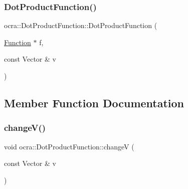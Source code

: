 \hypertarget{classocra_1_1DotProductFunction_a369a245fec0cfe2d4f72bfd577ab7ad0}{}\label{classocra_1_1DotProductFunction_a369a245fec0cfe2d4f72bfd577ab7ad0} 
\subsubsection{\texorpdfstring{Dot\+Product\+Function()}{DotProductFunction()}\hspace{0.1cm}{\footnotesize\ttfamily [2/2]}}
{\footnotesize\ttfamily ocra\+::\+Dot\+Product\+Function\+::\+Dot\+Product\+Function (\begin{DoxyParamCaption}\item[{\hyperlink{classocra_1_1Function}{Function} $\ast$}]{f,  }\item[{const Vector \&}]{v }\end{DoxyParamCaption})}



\subsection{Member Function Documentation}
\hypertarget{classocra_1_1DotProductFunction_a2c7c65e80d7fb5ac1da43421a792f77b}{}\label{classocra_1_1DotProductFunction_a2c7c65e80d7fb5ac1da43421a792f77b} 
\subsubsection{\texorpdfstring{change\+V()}{changeV()}}
{\footnotesize\ttfamily void ocra\+::\+Dot\+Product\+Function\+::changeV (\begin{DoxyParamCaption}\item[{const Vector \&}]{v }\end{DoxyParamCaption})}

\hypertarget{classocra_1_1DotProductFunction_af088997b35bf792a1f1c9c6fb78c0fe1}{}\label{classocra_1_1DotProductFunction_af088997b35bf792a1f1c9c6fb78c0fe1} 
